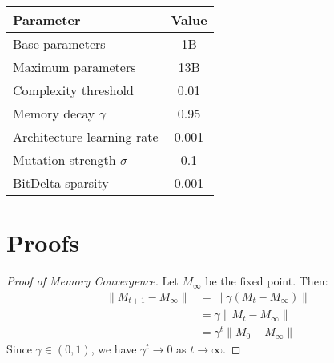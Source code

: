 \documentclass[11pt,a4paper]{article}
\theoremstyle{definition}
\begin{document}
\begin{table}[h]
\centering
\begin{tabular}{|l|c|}
\hline
\textbf{Parameter} & \textbf{Value} \\
\hline
Base parameters & 1B \\
Maximum parameters & 13B \\
Complexity threshold & 0.01 \\
Memory decay $\gamma$ & 0.95 \\
Architecture learning rate & 0.001 \\
Mutation strength $\sigma$ & 0.1 \\
BitDelta sparsity & 0.001 \\
\hline
\end{tabular}
\end{table}

\section{Proofs}

\begin{proof}[Proof of Memory Convergence]
Let $M_\infty$ be the fixed point. Then:
\begin{align}
\|M_{t+1} - M_\infty\| &= \|\gamma(M_t - M_\infty)\| \\
&= \gamma\|M_t - M_\infty\| \\
&= \gamma^t\|M_0 - M_\infty\|
\end{align}
Since $\gamma \in (0,1)$, we have $\gamma^t \rightarrow 0$ as $t \rightarrow \infty$.
\end{proof}
\end{document}
